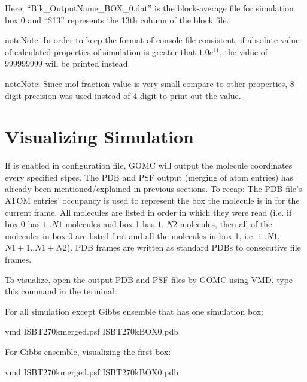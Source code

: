 \documentclass[letterpaper,10pt,english]{sphinxmanual}
\begin{document}
Here, “Blk\_OutputName\_BOX\_0.dat” is the block-average file for simulation box 0 and “\$13” represents the 13th column of the block file.

\begin{sphinxadmonition}{note}{Note:}
In order to keep the format of console file consistent, if absolute value of calculated properties of simulation is greater that \(1.0e^{11}\), the value of 999999999 will be printed instead.
\end{sphinxadmonition}

\begin{sphinxadmonition}{note}{Note:}
Since mol fraction value is very small compare to other properties, 8 digit precision was used instead of 4 digit to print out the value.
\end{sphinxadmonition}


\section{Visualizing Simulation}
\label{\detokenize{output_file:visualizing-simulation}}
If  is enabled in configuration file, GOMC will output the molecule coordinates every specified stpes. The PDB and PSF output (merging of atom entries) has already been mentioned/explained in previous sections. To recap: The PDB file’s ATOM entries’ occupancy is used to represent the box the molecule is in for the current frame. All molecules are listed in order in which they were read (i.e. if box 0 has \(1..N1\) molecules and box 1 has \(1..N2\) molecules, then all of the molecules in box 0 are listed first and all the molecules in box 1, i.e. \(1..N1\), \(N1 + 1..N1 + N2\)). PDB frames are written as standard PDBs to consecutive file frames.

To visualize, open the output PDB and PSF files by GOMC using VMD, type this command in the terminal:

For all simulation except Gibbs ensemble that has one simulation box:

%
\begin{sphinxVerbatim}[commandchars=\\\{\}]
\PYGZdl{} vmd ISB\PYGZus{}T\PYGZus{}270\PYGZus{}k\PYGZus{}merged.psf ISB\PYGZus{}T\PYGZus{}270\PYGZus{}k\PYGZus{}BOX\PYGZus{}0.pdb
\end{sphinxVerbatim}

For Gibbs ensemble, visualizing the first box:

%
\begin{sphinxVerbatim}[commandchars=\\\{\}]
\PYGZdl{} vmd ISB\PYGZus{}T\PYGZus{}270\PYGZus{}k\PYGZus{}merged.psf ISB\PYGZus{}T\PYGZus{}270\PYGZus{}k\PYGZus{}BOX\PYGZus{}0.pdb
\end{sphinxVerbatim}
\end{document}
